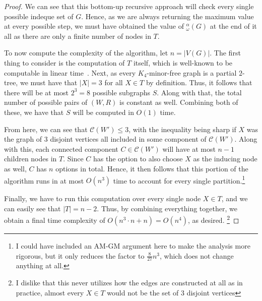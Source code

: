 \documentclass{article}
\newcommand{\idq}{{}^{\alpha}_{\omega}}
\begin{document}
\begin{proof}
    We can see that this bottom-up recursive approach will check every single possible indeque set of $G$. Hence, as we are always returning the maximum value at every possible step, we must have obtained the value of $\idq(G)$ at the end of it all as there are only a finite number of nodes in $T$.

    To now compute the complexity of the algorithm, let $n = |V(G)|$. The first thing to consider is the computation of $T$ itself, which is well-known to be computable in linear time~\cite{HLB}. Next, as every $K_4$-minor-free graph is a partial $2$-tree, we must have that $|X| = 3$ for all $X \in T$ by definition. Thus, it follows that there will be at most $2^3 = 8$ possible subgraphs $S$. Along with that, the total number of possible pairs of $(W,R)$ is constant as well. Combining both of these, we have that $S$ will be computed in $O(1)$ time.

    From here, we can see that $\mathcal{C}(W') \leq 3$, with the inequality being sharp if $X$ was the graph of $3$ disjoint vertices all included in some component of $\mathcal{C}(W')$. Along with this, each connected component $C \in \mathcal{C}(W')$ will have at most $n - 1$ children nodes in $T$. Since $C$ has the option to also choose $X$ as the inducing node as well, $C$ has $n$ options in total. Hence, it then follows that this portion of the algorithm runs in at most $O(n^3)$ time to account for every single partition.\footnote{I could have included an AM-GM argument here to make the analysis more rigorous, but it only reduces the factor to $\frac{8}{27}n^3$, which does not change anything at all.}

    Finally, we have to run this computation over every single node $X \in T$, and we can easily see that $|T| = n - 2$. Thus, by combining everything together, we obtain a final time complexity of $O(n^3 \cdot n + n) = O(n^4)$, as desired. \footnote{I dislike that this never utilizes how the edges are constructed at all as in practice, almost every $X \in T$ would not be the set of $3$ disjoint vertices}
\end{proof}

\end{document}
